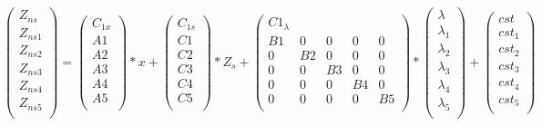 \[\left(\begin{array}{c}
  Z_{ns}\\
  \hline
  Z_{ns1} \\
  Z_{ns2} \\
  Z_{ns3} \\
  Z_{ns4} \\
  Z_{ns5} \\
\end{array}\right) =
\left(\begin{array}{c}
  C_{1x}\\
  \hline
  A1\\
  A2\\
  A3\\
  A4\\
  A5\\
\end{array}\right)*x +
\left(\begin{array}{c}
  C_{1s}\\
  \hline
  C1\\
  C2\\
  C3\\
  C4\\
  C5\\
\end{array}\right)*Z_{s} +
\left(\begin{array}{ccccc}
  C1_{\lambda}\\
  \hline
  B1&0&0&0&0\\
  0&B2&0&0&0\\
  0&0&B3&0&0\\
  0&0&0&B4&0\\
  0&0&0&0&B5\\
\end{array}\right)*
\left(\begin{array}{c}
  \lambda\\
  \hline
  \lambda _{1} \\
  \lambda _{2}\\
  \lambda _{3}\\
  \lambda _{4}\\
  \lambda _{5}\\
\end{array}\right)+
\left(\begin{array}{c}
  cst\\
  \hline
   cst_{1} \\
   cst_{2}\\
   cst_{3}\\
   cst_{4}\\
   cst_{5}\\
\end{array}\right)
\]

